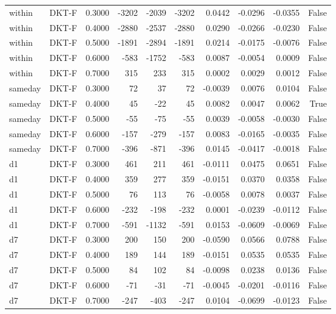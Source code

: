 \begin{tabular}{llrrrrrrrr}
within & DKT-F & 0.3000 & -3202 & -2039 & -3202 & 0.0442 & -0.0296 & -0.0355 & False \\
within & DKT-F & 0.4000 & -2880 & -2537 & -2880 & 0.0290 & -0.0266 & -0.0230 & False \\
within & DKT-F & 0.5000 & -1891 & -2894 & -1891 & 0.0214 & -0.0175 & -0.0076 & False \\
within & DKT-F & 0.6000 & -583 & -1752 & -583 & 0.0087 & -0.0054 & 0.0009 & False \\
within & DKT-F & 0.7000 & 315 & 233 & 315 & 0.0002 & 0.0029 & 0.0012 & False \\
sameday & DKT-F & 0.3000 & 72 & 37 & 72 & -0.0039 & 0.0076 & 0.0104 & False \\
sameday & DKT-F & 0.4000 & 45 & -22 & 45 & 0.0082 & 0.0047 & 0.0062 & True \\
sameday & DKT-F & 0.5000 & -55 & -75 & -55 & 0.0039 & -0.0058 & -0.0030 & False \\
sameday & DKT-F & 0.6000 & -157 & -279 & -157 & 0.0083 & -0.0165 & -0.0035 & False \\
sameday & DKT-F & 0.7000 & -396 & -871 & -396 & 0.0145 & -0.0417 & -0.0018 & False \\
d1 & DKT-F & 0.3000 & 461 & 211 & 461 & -0.0111 & 0.0475 & 0.0651 & False \\
d1 & DKT-F & 0.4000 & 359 & 277 & 359 & -0.0151 & 0.0370 & 0.0358 & False \\
d1 & DKT-F & 0.5000 & 76 & 113 & 76 & -0.0058 & 0.0078 & 0.0037 & False \\
d1 & DKT-F & 0.6000 & -232 & -198 & -232 & 0.0001 & -0.0239 & -0.0112 & False \\
d1 & DKT-F & 0.7000 & -591 & -1132 & -591 & 0.0153 & -0.0609 & -0.0069 & False \\
d7 & DKT-F & 0.3000 & 200 & 150 & 200 & -0.0590 & 0.0566 & 0.0788 & False \\
d7 & DKT-F & 0.4000 & 189 & 144 & 189 & -0.0151 & 0.0535 & 0.0535 & False \\
d7 & DKT-F & 0.5000 & 84 & 102 & 84 & -0.0098 & 0.0238 & 0.0136 & False \\
d7 & DKT-F & 0.6000 & -71 & -31 & -71 & -0.0045 & -0.0201 & -0.0116 & False \\
d7 & DKT-F & 0.7000 & -247 & -403 & -247 & 0.0104 & -0.0699 & -0.0123 & False \\
\bottomrule
\end{tabular}
